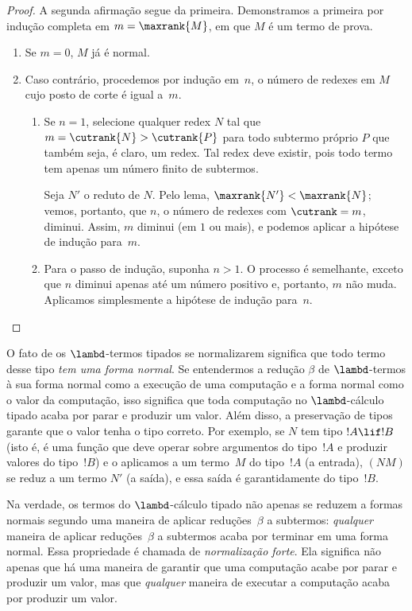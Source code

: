\documentclass[../../../include/open-logic-section]{subfiles}
\begin{document}
\begin{proof}
  A segunda afirmação segue da primeira. Demonstramos a primeira por
  indução completa em $m=\maxrank{M}$, em que $M$ é um termo de prova.
  \begin{enumerate}

  \item Se $m=0$, $M$ já é normal.
  \item
    Caso contrário, procedemos por indução em~$n$, o número de
    redexes em $M$ cujo posto de corte é igual a~$m$.
    \begin{enumerate}
    \item Se $n=1$, selecione qualquer redex $N$ tal que $m = \cutrank{N} >
      \cutrank{P}$ para todo subtermo próprio $P$ que também seja, é
      claro, um redex. Tal redex deve existir, pois todo termo tem
      apenas um número finito de subtermos.

      Seja $N'$ o reduto de $N$. Pelo lema,
      $\maxrank{N'} < \maxrank{N}$; vemos, portanto, que $n$, o número
      de redexes com $\cutrank=m$, diminui. Assim, $m$ diminui (em $1$
      ou mais), e podemos aplicar a hipótese de indução para~$m$.
    \item Para o passo de indução, suponha $n>1$. O processo é
      semelhante, exceto que $n$ diminui apenas até um número positivo
      e, portanto, $m$ não muda. Aplicamos simplesmente a hipótese de
      indução para~$n$.
    \end{enumerate}
\end{enumerate}
\end{proof}

O fato de os $\lambd$-termos tipados se normalizarem significa que todo
termo desse tipo \emph{tem uma forma normal}. Se entendermos a redução
$\beta$ de $\lambd$-termos à sua forma normal como a execução de uma
computação e a forma normal como o valor da computação, isso significa
que toda computação no $\lambd$-cálculo tipado acaba por parar e produzir
um valor. Além disso, a preservação de tipos garante que o valor tenha
o tipo correto. Por exemplo, se $N$ tem tipo $!A \lif !B$ (isto é, é uma
função que deve operar sobre argumentos do tipo~$!A$ e produzir valores
do tipo~$!B$) e o aplicamos a um termo~$M$ do tipo~$!A$ (a entrada),
$(NM)$ se reduz a um termo $N'$ (a saída), e essa saída é garantidamente
do tipo~$!B$.

Na verdade, os termos do $\lambd$-cálculo tipado não apenas se reduzem a
formas normais segundo uma maneira de aplicar reduções~$\beta$ a
subtermos: \emph{qualquer} maneira de aplicar reduções~$\beta$ a
subtermos acaba por terminar em uma forma normal. Essa propriedade é
chamada de \emph{normalização forte}. Ela significa não apenas que há
uma maneira de garantir que uma computação acabe por parar e produzir um
valor, mas que \emph{qualquer} maneira de executar a computação acaba por
produzir um valor.
\end{document}
